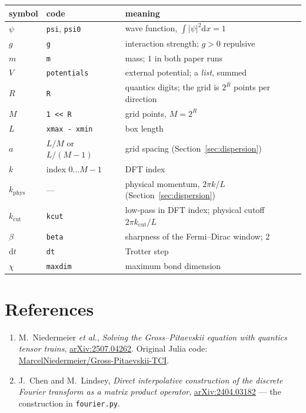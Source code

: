 \documentclass[11pt,a4paper]{article}
\newcommand{\code}[1]{\texttt{#1}}
\newcommand{\kph}{k_{\mathrm{phys}}}
\newcommand{\kcut}{k_{\mathrm{cut}}}
\newcommand{\dd}{\mathrm{d}}
\begin{document}
\begin{center}
\begin{tabularx}{\textwidth}{@{}llL@{}}
\toprule
symbol & code & meaning \\
\midrule
$\psi$   & \code{psi}, \code{psi0} & wave function, $\int|\psi|^2\dd x = 1$ \\
$g$      & \code{g}    & interaction strength; $g > 0$ repulsive \\
$m$      & \code{m}    & mass; $1$ in both paper runs \\
$V$      & \code{potentials} & external potential; a \emph{list}, summed \\
$R$      & \code{R}    & quantics digits; the grid is $2^R$ points per direction \\
$M$      & \code{1 << R} & grid points, $M = 2^R$ \\
$L$      & \code{xmax - xmin} & box length \\
$a$      & $L/M$ or $L/(M-1)$ & grid spacing (Section~\ref{sec:dispersion}) \\
$k$      & index $0\dots M-1$ & DFT index \\
$\kph$   & --- & physical momentum, $2\pi k/L$ (Section~\ref{sec:dispersion}) \\
$\kcut$  & \code{kcut} & low-pass in DFT index; physical cutoff $2\pi \kcut/L$ \\
$\beta$  & \code{beta} & sharpness of the Fermi--Dirac window; $2$ \\
$\dd t$  & \code{dt}   & Trotter step \\
$\chi$   & \code{maxdim} & maximum bond dimension \\
\bottomrule
\end{tabularx}
\end{center}

\section*{References}

\begin{enumerate}[leftmargin=1.5em]
\item M.~Niedermeier \emph{et al.}, \emph{Solving the Gross--Pitaevskii equation with
  quantics tensor trains}, \href{https://arxiv.org/abs/2507.04262}{arXiv:2507.04262}.
  Original Julia code:
  \href{https://github.com/MarcelNiedermeier/Gross-Pitaevskii-TCI}{MarcelNiedermeier/Gross-Pitaevskii-TCI}.
\item J.~Chen and M.~Lindsey, \emph{Direct interpolative construction of the discrete
  Fourier transform as a matrix product operator},
  \href{https://arxiv.org/abs/2404.03182}{arXiv:2404.03182} --- the construction in
  \code{fourier.py}.
\end{enumerate}
\end{document}
